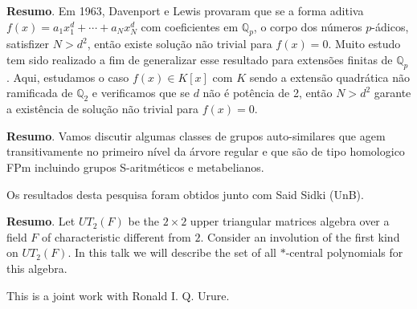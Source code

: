 
\noindent\textbf{Resumo}.\label{bpm} 
Em 1963, Davenport e Lewis provaram que se a forma aditiva $f(x) = a_1x_1^d + \cdots + a_Nx_N^d$ com coeficientes em $\mathbb{Q}_p$, o corpo dos números $p$-ádicos, satisfizer $N > d^2$, então existe solução não trivial para $f(x) = 0$. Muito estudo tem sido realizado a fim de generalizar esse resultado para extensões finitas de $\mathbb{Q}_p$. Aqui, estudamos o caso $f(x) \in K[x]$ com $K$ sendo a extensão quadrática não ramificada de $\mathbb{Q}_2$ e verificamos que se $d$ não é potência de 2, então $N> d^2$ garante a existência de solução não trivial para $f(x) = 0$.

\vspace{24pt}
	


\noindent\textbf{Resumo}.\label{dehko} Vamos discutir algumas classes de grupos auto-similares que agem transitivamente no primeiro nível da árvore regular e que são de tipo homologico FPm incluindo grupos S-aritméticos e metabelianos.

\vspace*{0.5cm} \noindent Os resultados desta pesquisa foram obtidos junto com Said Sidki (UnB).

	\vspace{24pt}

	
	
	\noindent\textbf{Resumo}.\label{djg} 
	Let $UT_2(F)$ be the $2 \times 2$ upper triangular matrices algebra over a field $F$ of characteristic different from $2$. Consider an involution of the first kind on $UT_2(F)$. In this talk we will describe the set of all $*$-central polynomials for this algebra.

\vspace*{0.5cm} \noindent This is a joint work with Ronald I. Q. Urure.

